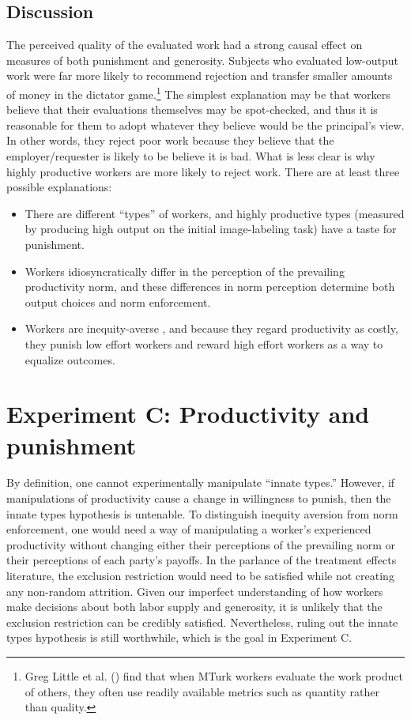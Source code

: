 \documentclass[12pt]{article}
\begin{document}
\subsection{Discussion} 
The perceived quality of the evaluated work had a strong causal effect
on measures of both punishment and generosity. Subjects who evaluated
low-output work were far more likely to recommend rejection and
transfer smaller amounts of money in the dictator game.\footnote{Greg
  Little et al. (\citeyear{little2010exploring}) find that when MTurk
  workers evaluate the work product of others, they often use readily
  available metrics such as quantity rather than quality.} The
simplest explanation may be that workers believe that their
evaluations themselves may be spot-checked, and thus it is reasonable
for them to adopt whatever they believe would be the principal's
view. In other words, they reject poor work because they believe that
the employer/requester is likely to be believe it is bad. What is less
clear is why highly productive workers are more likely to reject
work. There are at least three possible explanations:

\begin{itemize} 
  \item There are different ``types'' of workers, and highly
    productive types (measured by producing high output on the initial
    image-labeling task) have a taste for punishment.
  \item Workers idiosyncratically differ in the perception of the
    prevailing productivity norm, and these differences in norm
    perception determine both output choices and norm enforcement.
   \item Workers are inequity-averse \citep{fehr1999theory}, and
     because they regard productivity as costly, they punish low
     effort workers and reward high effort workers as a way to
     equalize outcomes.
\end{itemize} 

\section{Experiment C: Productivity and punishment}
By definition, one cannot experimentally manipulate ``innate types.''
However, if manipulations of productivity cause a change in
willingness to punish, then the innate types hypothesis is
untenable. To distinguish inequity aversion from norm enforcement, one
would need a way of manipulating a worker's experienced productivity
without changing either their perceptions of the prevailing norm or
their perceptions of each party's payoffs. In the parlance of the
treatment effects literature, the exclusion restriction would need to
be satisfied while not creating any non-random attrition. Given our
imperfect understanding of how workers make decisions about both labor
supply and generosity, it is unlikely that the exclusion restriction
can be credibly satisfied. Nevertheless, ruling out the innate types
hypothesis is still worthwhile, which is the goal in Experiment C.
\end{document}
